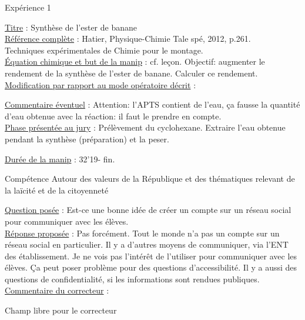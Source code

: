 \begin{reportBlock}{Expérience 1}

\underline{Titre} : Synthèse de l'ester de banane  \\

\underline{Référence complète} : Hatier, Physique-Chimie Tale spé, 2012, p.261.  \\ 
Techniques expérimentales de Chimie pour le montage. \\

\underline{Équation chimique et but de la manip} : cf. leçon. Objectif: augmenter le rendement de la synthèse de l'ester de banane. Calculer ce rendement. \\

\underline{Modification par rapport au mode opératoire décrit} : 

\underline{Commentaire éventuel} : Attention: l'APTS contient de l'eau, ça fausse la quantité d'eau obtenue avec la réaction: il faut le prendre en compte. \\

\underline{Phase présentée au jury} : Prélèvement du cyclohexane. Extraire l'eau obtenue pendant la synthèse (préparation) et la peser.

\underline{Durée de la manip} : 32'19- fin.  \\

\end{reportBlock}



\begin{reportBlock}{Compétence \og Autour des valeurs de la République et des thématiques relevant de la laïcité et de la citoyenneté \fg{}}

\underline{Question posée} : Est-ce une bonne idée de créer un compte sur un réseau social pour communiquer avec les élèves. \\

\underline{Réponse proposée} :  Pas forcément. Tout le monde n'a pas un compte sur un réseau social en particulier. Il y a d'autres moyens de communiquer, via l'ENT des établissement. Je ne vois pas l'intérêt de l'utiliser pour communiquer avec les élèves. Ça peut poser problème pour des questions d'accessibilité. Il y a aussi des questions de confidentialité, si les informations sont rendues publiques.  \\

\underline{Commentaire du correcteur} : 

\end{reportBlock}




\begin{reportBlock}{Champ libre pour le correcteur}
\end{reportBlock}

